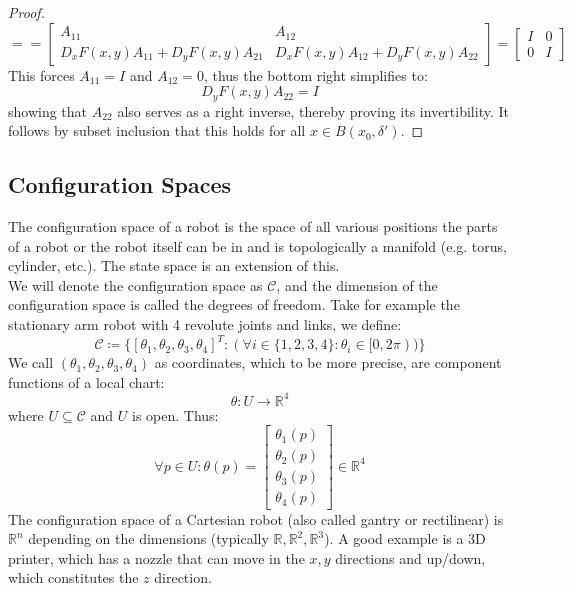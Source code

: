 \documentclass[10pt,letterpaper]{article} %
\begin{document}
\begin{proof}
\begin{equation*}
=  = \begin{bmatrix}
A_{11} & A_{12}\\
D_xF(x, y)A_{11} + D_yF(x, y)A_{21} & D_xF(x, y)A_{12} + D_yF(x, y)A_{22}
\end{bmatrix} = \begin{bmatrix}
I & 0\\
0 & I
\end{bmatrix}
\end{equation*}
This forces $A_{11} = I$ and $A_{12} = 0$, thus the bottom right simplifies to:
\begin{equation*}
D_yF(x, y)A_{22} = I
\end{equation*}
showing that $A_{22}$ also serves as a right inverse, thereby proving its invertibility. It follows by subset inclusion that this holds for all $x \in B(x_0, \delta')$. 
\end{proof}

\subsection{Configuration Spaces}
The configuration space of a robot is the space of all various positions the parts of a robot or the robot itself can be in and is topologically a manifold (e.g. torus, cylinder, etc.). The state space is an extension of this.\\

We will denote the configuration space as $\mathcal{C}$, and the dimension of the configuration space is called the degrees of freedom. Take for example the stationary arm robot with 4 revolute joints and links, we define:
\begin{equation*}
\mathcal{C} \coloneq \{[\theta_1, \theta_2, \theta_3, \theta_4]^T: (\forall i \in \{1, 2, 3, 4\}: \theta_i \in [0, 2\pi))\}
\end{equation*}
We call $(\theta_1, \theta_2, \theta_3, \theta_4)$ as coordinates, which to be more precise, are component functions of a local chart:
\begin{equation*}
\theta: U \xrightarrow{} \mathbb{R}^4
\end{equation*}
where $U \subseteq \mathcal{C}$ and $U$ is open. Thus:
\begin{equation*}
\forall p \in U: \theta(p) = \begin{bmatrix}
\theta_1(p)\\\theta_2(p)\\\theta_3(p)\\\theta_4(p)
\end{bmatrix} \in \mathbb{R}^4
\end{equation*}
The configuration space of a Cartesian robot (also called gantry or rectilinear) is $\mathbb{R}^n$ depending on the dimensions (typically $\mathbb{R}, \mathbb{R}^2, \mathbb{R}^3$). A good example is a 3D printer, which has a nozzle that can move in the $x, y$ directions and up/down, which constitutes the $z$ direction.
\end{document}
